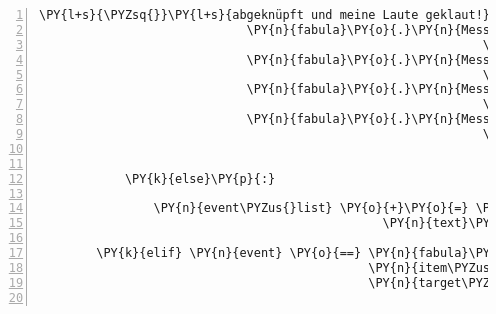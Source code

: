 \begin{Verbatim}[commandchars=\\\{\},numbers=left,firstnumber=1,stepnumber=1]
                                                                   \PY{l+s}{\PYZsq{}}\PY{l+s}{abgeknüpft und meine Laute geklaut!}\PY{l+s}{\PYZsq{}}\PY{p}{)}\PY{p}{]}\PY{p}{)}\PY{p}{,}
                             \PY{n}{fabula}\PY{o}{.}\PY{n}{Message}\PY{p}{(}\PY{p}{[}\PY{n}{fabula}\PY{o}{.}\PY{n}{SaysEvent}\PY{p}{(}\PY{n}{identifier}\PY{o}{=}\PY{n}{ID\PYZus{}CASSANDRA}\PY{p}{,}
                                                              \PY{n}{text}\PY{o}{=}\PY{l+s}{\PYZsq{}}\PY{l+s}{Oh nein, das tut mir aber leid!}\PY{l+s}{\PYZsq{}}\PY{p}{)}\PY{p}{]}\PY{p}{)}\PY{p}{,}
                             \PY{n}{fabula}\PY{o}{.}\PY{n}{Message}\PY{p}{(}\PY{p}{[}\PY{n}{fabula}\PY{o}{.}\PY{n}{SaysEvent}\PY{p}{(}\PY{n}{identifier}\PY{o}{=}\PY{n}{ID\PYZus{}KUNI}\PY{p}{,}
                                                              \PY{n}{text}\PY{o}{=}\PY{l+s}{\PYZsq{}}\PY{l+s}{Lässt du uns jetzt durch?}\PY{l+s}{\PYZsq{}}\PY{p}{)}\PY{p}{]}\PY{p}{)}\PY{p}{,}
                             \PY{n}{fabula}\PY{o}{.}\PY{n}{Message}\PY{p}{(}\PY{p}{[}\PY{n}{fabula}\PY{o}{.}\PY{n}{SaysEvent}\PY{p}{(}\PY{n}{identifier}\PY{o}{=}\PY{l+s}{\PYZsq{}}\PY{l+s}{guardian}\PY{l+s}{\PYZsq{}}\PY{p}{,}
                                                              \PY{n}{text}\PY{o}{=}\PY{l+s}{\PYZsq{}}\PY{l+s}{Nein, meine Aufgabe ist es den Weg zu bewachen.}\PY{l+s}{\PYZsq{}}\PY{p}{)}\PY{p}{]}\PY{p}{)}\PY{p}{,}
                             \PY{n}{fabula}\PY{o}{.}\PY{n}{Message}\PY{p}{(}\PY{p}{[}\PY{n}{fabula}\PY{o}{.}\PY{n}{SaysEvent}\PY{p}{(}\PY{n}{identifier}\PY{o}{=}\PY{l+s}{\PYZsq{}}\PY{l+s}{guardian}\PY{l+s}{\PYZsq{}}\PY{p}{,}
                                                              \PY{n}{text}\PY{o}{=}\PY{l+s}{\PYZsq{}}\PY{l+s}{Auch wenn ich mich sofort auf und davon machen würde, wenn }\PY{l+s}{\PYZsq{}}
                                                                   \PY{l+s}{\PYZsq{}}\PY{l+s}{ich wieder eine Laute hätte.}\PY{l+s}{\PYZsq{}}\PY{p}{)}\PY{p}{]}\PY{p}{)}\PY{p}{]}

            \PY{k}{else}\PY{p}{:}

                \PY{n}{event\PYZus{}list} \PY{o}{+}\PY{o}{=} \PY{p}{[}\PY{n}{fabula}\PY{o}{.}\PY{n}{SaysEvent}\PY{p}{(}\PY{n}{identifier}\PY{o}{=}\PY{l+s}{\PYZsq{}}\PY{l+s}{guardian}\PY{l+s}{\PYZsq{}}\PY{p}{,}
                                                \PY{n}{text}\PY{o}{=}\PY{l+s}{\PYZsq{}}\PY{l+s}{Oh lecker, aber das können wir nicht zu zweit essen!}\PY{l+s}{\PYZsq{}}\PY{p}{)}\PY{p}{]}

        \PY{k}{elif} \PY{n}{event} \PY{o}{==} \PY{n}{fabula}\PY{o}{.}\PY{n}{TriesToDropEvent}\PY{p}{(}\PY{n}{identifier}\PY{o}{=}\PY{n}{ID\PYZus{}KUNI}\PY{p}{,}
                                              \PY{n}{item\PYZus{}identifier}\PY{o}{=}\PY{l+s}{\PYZsq{}}\PY{l+s}{string\PYZus{}harp}\PY{l+s}{\PYZsq{}}\PY{p}{,}
                                              \PY{n}{target\PYZus{}identifier}\PY{o}{=}\PY{n}{ID\PYZus{}KUNI}\PY{p}{)}\PY{p}{:}


\end{Verbatim}
